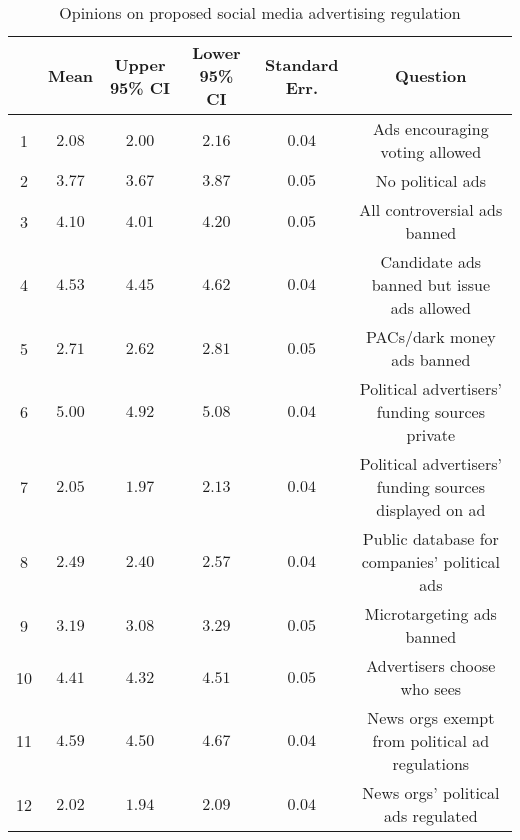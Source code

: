 
\begin{table}[!htbp] \centering 
  \caption{Opinions on proposed social media advertising regulation} 
  \label{table:ad-reg} 
\begin{tabular}{@{\extracolsep{5pt}} cccccc} 
\toprule 
 & Mean & Upper 95\% CI & Lower 95\% CI & Standard Err. & Question \\ 
\midrule 1 & $2.08$ & $2.00$ & $2.16$ & $0.04$ & Ads encouraging voting allowed \\ 
2 & $3.77$ & $3.67$ & $3.87$ & $0.05$ & No political ads \\ 
3 & $4.10$ & $4.01$ & $4.20$ & $0.05$ & All controversial ads banned \\ 
4 & $4.53$ & $4.45$ & $4.62$ & $0.04$ & Candidate ads banned but issue ads allowed \\ 
5 & $2.71$ & $2.62$ & $2.81$ & $0.05$ & PACs/dark money ads banned \\ 
6 & $5.00$ & $4.92$ & $5.08$ & $0.04$ & Political advertisers' funding sources private \\ 
7 & $2.05$ & $1.97$ & $2.13$ & $0.04$ & Political advertisers' funding sources displayed on ad \\ 
8 & $2.49$ & $2.40$ & $2.57$ & $0.04$ & Public database for companies' political ads \\ 
9 & $3.19$ & $3.08$ & $3.29$ & $0.05$ & Microtargeting ads banned \\ 
10 & $4.41$ & $4.32$ & $4.51$ & $0.05$ & Advertisers choose who sees \\ 
11 & $4.59$ & $4.50$ & $4.67$ & $0.04$ & News orgs exempt from political ad regulations  \\ 
12 & $2.02$ & $1.94$ & $2.09$ & $0.04$ & News orgs' political ads regulated \\ 
\bottomrule 
\end{tabular} 
\end{table} 
